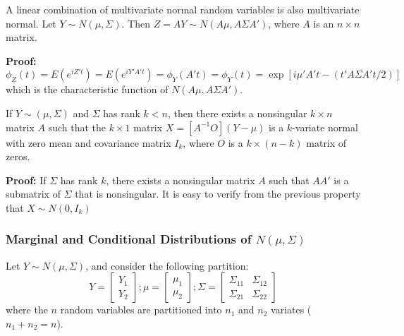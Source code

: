\documentclass{article}
\begin{document}
\begin{property}
    A linear combination of multivariate normal random variables is also multivariate normal. Let \(Y\sim N(\mu,\Sigma)\). Then \(Z=AY \sim N(A\mu,A\Sigma A')\), where \(A\) is an \(n \times n\) matrix.
\end{property}

\textbf{Proof:} 
\begin{equation*}
    \phi_Z(t)=E(e^{iZ't})=E(e^{iY'A't})=\phi_Y(A't)=\phi_Y(t)=\exp{[i\mu'A't-(t'A\Sigma A' t/2)]}
\end{equation*}
which is the characteristic function of \(N(A\mu,A\Sigma A')\).

\begin{property}
    If \(Y\sim(\mu,\Sigma)\) and \(\Sigma\) has rank \(k<n\), then there exists a nonsingular \(k \times n\) matrix \(A\) such that the \(k \times 1\) matrix \(X=[A^{-1}O](Y-\mu)\) is a \(k\)-variate normal with zero mean and covariance matrix \(I_k\), where \(O\) is a \(k \times (n-k)\) matrix of zeros.
\end{property}

\textbf{Proof:} If \(\Sigma\) has rank \(k\), there exists a nonsingular matrix \(A\) such that \(AA'\) is a submatrix of \(\Sigma\) that is nonsingular. It is easy to verify from the previous property that \(X\sim N(0,I_k)\)


\subsubsection{Marginal and Conditional Distributions of \(N(\mu,\Sigma)\)}

Let \(Y\sim N(\mu,\Sigma)\), and consider the following partition:
\begin{equation*}
    Y=\begin{bmatrix}
        Y_1\\
        Y_2
    \end{bmatrix}
    ; \mu = \begin{bmatrix}
        \mu_1\\
        \mu_2
    \end{bmatrix}
    ; \Sigma = \begin{bmatrix}
        \Sigma_{11} & \Sigma_{12}\\
        \Sigma_{21} & \Sigma_{22}
    \end{bmatrix}
\end{equation*}
where the \(n\) random variables are partitioned into \(n_1\) and \(n_2\) variates (\(n_1+n_2=n\)).
\end{document}
